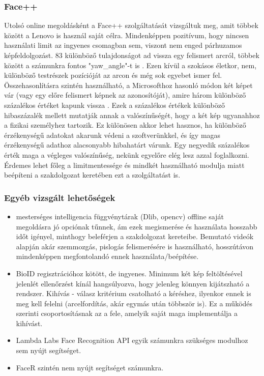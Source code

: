 \subsubsection{Face++}
Utolsó online megoldásként a Face++ szolgáltatását vizsgáltuk meg, amit többek között a Lenovo is használ saját célra. Mindenképpen pozitívum, hogy nincsen használati limit az ingyenes csomagban sem, viszont nem enged párhuzamos képfeldolgozást. 83 különböző tulajdonságot ad vissza egy felismert arcról, többek között a számunkra fontos "yaw\_angle"-t is \cite{FACEPP}. Ezen kívül a szokásos életkor, nem, különböző testrészek pozícióját az arcon és még sok egyebet ismer fel.
\\Összehasonlításra szintén használható, a Microsofthoz hasonló módon két képet vár (vagy egy előre felismert képnek az azonosítóját), amire három különböző százalékos értéket kapunk vissza \cite{FACEPP_COMPARE}. Ezek a százalékos értékek különböző hibaszázalék mellett mutatják annak a valószínűségét, hogy a két kép ugyanahhoz a fizikai személyhez tartozik. Ez különösen akkor lehet hasznos, ha különböző érzékenységű adatokat akarunk védeni a szoftverünkkel, és így magas érzékenységű adathoz alacsonyabb hibahatárt várunk. Egy negyedik százalékos érték maga a végleges valószínűség, nekünk egyelőre elég lesz azzal foglalkozni. Érdemes lehet főleg a limitmentessége és mindkét használható modulja miatt beépíteni a szakdolgozat keretében ezt a szolgáltatást is. 

\subsubsection{Egyéb vizsgált lehetőségek}

\begin{itemize}
\item mesterséges intelligencia függvénytárak (Dlib, opencv) offline saját megoldásra jó opciónak tűnnek, ám ezek megismerése és használata hosszabb időt igényel, minthogy beleférjen a szakdolgozat kereteibe. Bemutató videók alapján akár szemmozgás, pislogás felismerésére is használható, hosszútávon mindenképpen megfontolandó ennek használata/beépítése.
\item BioID regisztrációhoz kötött, de ingyenes. Minimum két kép feltöltésével jelenlét ellenőrzést kínál hangsúlyozva, hogy jelenleg könnyen kijátszható a rendszer. Kihívás - válasz kritérium csatolható a kéréshez, ilyenkor ennek is meg kell felelni (arcelfordítás, akár egymás után többször is). Ez a működés szerinti csoportosításnak az a fele, amelyik saját maga implementálja a kihívást.
\item Lambda Labs Face Recognition API egyik számunkra szükséges modulhoz sem nyújt segítséget.
\item FaceR szintén nem nyújt segítséget számunkra.
\end{itemize}

